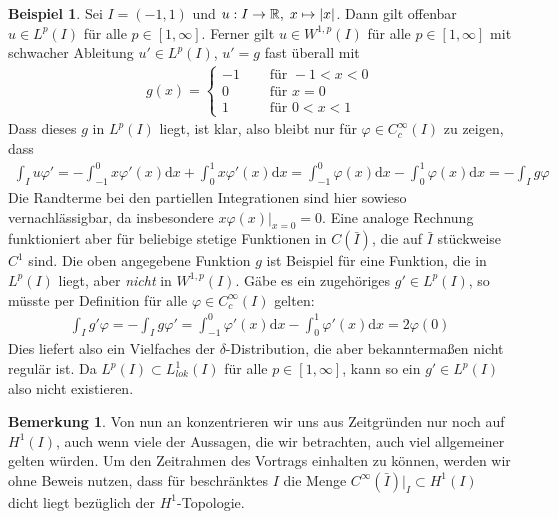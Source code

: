 \documentclass[twoside]{article}
\theoremstyle{definition}
\newtheorem{remark}[theorem]{Bemerkung}
\newtheorem{example}[theorem]{Beispiel}
\begin{document}
\begin{example}
Sei $I = (-1,1)$ und $u : I \to \mathbb{R}, \; x \mapsto \abs{x}$. Dann gilt offenbar $u \in L^p(I)$ für alle $p \in [1,\infty]$. Ferner gilt $u \in W^{1,p}(I)$ für alle $p \in [1,\infty]$ mit schwacher Ableitung $u' \in L^p(I)$, $u' = g$ fast überall mit
\begin{align*}
g(x) = \begin{cases}
-1 &\quad \text{ für } -1<x<0\\
0 &\quad \text{ für } x = 0\\
1 &\quad \text{ für } 0<x<1
\end{cases}
\end{align*}
Dass dieses $g$ in $L^p(I)$ liegt, ist klar, also bleibt nur für $\varphi \in C_c^\infty(I)$ zu zeigen, dass 
\begin{align*}
\int_I u \varphi' = -\int_{-1}^0 x \varphi'(x) \mathrm{d}x + \int_0^1 x \varphi'(x) \mathrm{d}x = \int_{-1}^0 \varphi(x) \mathrm{d}x - \int_0^1 \varphi(x) \mathrm{d}x = -\int_I g \varphi
\end{align*}
Die Randterme bei den partiellen Integrationen sind hier sowieso vernachlässigbar, da insbesondere $x \varphi(x)|_{x=0} = 0$. Eine analoge Rechnung funktioniert aber für beliebige stetige Funktionen in $C(\bar{I})$, die auf $\bar{I}$ stückweise $C^1$ sind. Die oben angegebene Funktion $g$ ist Beispiel für eine Funktion, die in $L^p(I)$ liegt, aber \textit{nicht} in $W^{1,p}(I)$. Gäbe es ein zugehöriges $g' \in L^p(I)$, so müsste per Definition für alle $\varphi \in C_c^\infty(I)$ gelten:
\begin{align*}
\int_I g' \varphi = - \int_I g \varphi' = \int_{-1}^0 \varphi'(x) \mathrm{d}x - \int_0^1 \varphi'(x)\mathrm{d}x = 2 \varphi(0)
\end{align*}
Dies liefert also ein Vielfaches der $\delta$-Distribution, die aber bekanntermaßen nicht regulär ist. Da $L^p(I) \subset L^1_{lok}(I)$ für alle $p \in [1,\infty]$, kann so ein $g' \in L^p(I)$ also nicht existieren.
\end{example}
\begin{remark}
Von nun an konzentrieren wir uns aus Zeitgründen nur noch auf $H^1(I)$, auch wenn viele der Aussagen, die wir betrachten, auch viel allgemeiner gelten würden. Um den Zeitrahmen des Vortrags einhalten zu können, werden wir ohne Beweis nutzen, dass für beschränktes $I$ die Menge $C^\infty(\bar{I})\vert_I \subset H^1(I)$ dicht liegt bezüglich der $H^1$-Topologie.
\end{remark}
\end{document}
